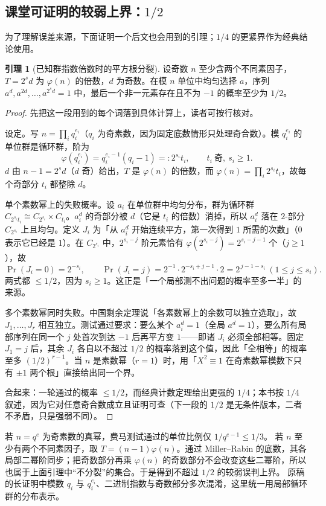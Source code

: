 \documentclass[UTF8,a4paper,11pt,oneside,openany,fontset=fandol]{ctexbook}
\theoremstyle{definition}
\newtheorem{lemma}[definition]{引理}
\begin{document}
\subsection{课堂可证明的较弱上界：\texorpdfstring{$1/2$}{1/2}}
为了理解误差来源，下面证明一个后文也会用到的引理；$1/4$ 的更紧界作为经典结论使用。
\begin{lemma}[已知群指数倍数时的平方根分裂]
设奇数 $n$ 至少含两个不同素因子，$T=2^s d$ 为 $\varphi(n)$ 的倍数，$d$ 为奇数。在模 $n$ 单位中均匀选择 $a$，序列 $a^d,a^{2d},\ldots,a^{2^sd}=1$ 中，最后一个非一元素存在且不为 $-1$ 的概率至少为 $1/2$。
\end{lemma}
\begin{proof}
先把这一段用到的每个词落到具体计算上，读者可按行核对。

设定。写 $n=\prod_i q_i^{e_i}$（$q_i$ 为奇素数，因为固定底数情形只处理奇合数）。模 $q_i^{e_i}$ 的单位群是循环群，阶为
\[
 \varphi(q_i^{e_i})=q_i^{e_i-1}(q_i-1)=:2^{s_i}t_i,\qquad t_i\ \text{奇},\ s_i\ge1 .
\]
$d$ 由 $n-1=2^s d$（$d$ 奇）给出，$T$ 是 $\varphi(n)$ 的倍数，而 $\varphi(n)=\prod_i2^{s_i}t_i$，故每个奇部分 $t_i$ 都整除 $d$。

单个素数幂上的失败概率。设 $a_i$ 在单位群中均匀分布，群为循环群 $C_{2^{s_i}t_i}\cong C_{2^{s_i}}\times C_{t_i}$。$a_i^d$ 的奇部分被 $d$（它是 $t_i$ 的倍数）消掉，所以 $a_i^d$ 落在 $2$-部分 $C_{2^{s_i}}$ 上且均匀。定义 $J_i$ 为「从 $a_i^d$ 开始连续平方，第一次得到 $1$ 所需的次数」（$0$ 表示它已经是 $1$）。在 $C_{2^{s_i}}$ 中，$2^{s_i-j}$ 阶元素恰有 $\varphi(2^{s_i-j})=2^{s_i-j-1}$ 个（$j\ge1$），故
\[
 \Pr(J_i=0)=2^{-s_i},\qquad \Pr(J_i=j)=2^{-1}\cdot2^{-s_i+j-1}\cdot2=2^{\,j-1-s_i}\ (1\le j\le s_i).
\]
两式都 $\le1/2$，因为 $s_i\ge1$。这正是「一个局部测不出问题的概率至多一半」的来源。

多个素数幂同时失败。中国剩余定理说「各素数幂上的余数可以独立选取」，故 $J_1,\ldots,J_r$ 相互独立。测试通过要求：要么某个 $a_i^d=1$（全局 $a^d=1$），要么所有局部序列在同一个 $j$ 处首次到达 $-1$ 后再平方变 $1$——即诸 $J_i$ 必须全部相等。固定 $J_1=j$ 后，其余 $J_i$ 各自以不超过 $1/2$ 的概率落到这个值，因此「全相等」的概率至多 $(1/2)^{r-1}$。当 $n$ 是素数幂（$r=1$）时，用「$X^2\equiv1$ 在奇素数幂模数下只有 $\pm1$ 两个根」直接给出同一个界。

合起来：一轮通过的概率 $\le1/2$，而经典计数定理给出更强的 $1/4$；本书按 $1/4$ 叙述，因为它对任意奇合数成立且证明可查（下一段的 $1/2$ 是无条件版本，二者不矛盾，只是强弱不同）。
\end{proof}
若 $n=q^e$ 为奇素数的真幂，费马测试通过的单位比例仅 $1/q^{e-1}\le1/3$。
若 $n$ 至少有两个不同素因子，取 $T=(n-1)\varphi(n)$。通过 Miller--Rabin 的底数，其各局部二幂阶同步；把奇数部分再乘 $\varphi(n)$ 的奇数部分不会改变这些二幂阶，所以也属于上面引理中“不分裂”的集合。于是得到不超过 $1/2$ 的较弱误判上界。
原稿的长证明中模数 $q_i$ 与 $q_i^{e_i}$、二进制指数与奇数部分多次混淆，这里统一用局部循环群的分布表示。
\end{document}
